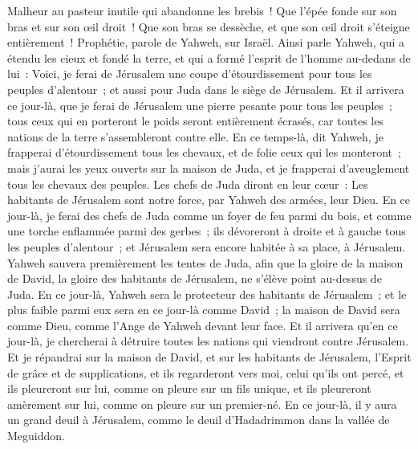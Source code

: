 \begin{multicols}{2}
Malheur au pasteur inutile qui abandonne les brebis~! Que l'épée fonde sur son bras et sur son œil droit~! Que son bras se dessèche, et que son œil droit s'éteigne entièrement~!
\VerseOne{}Prophétie, parole de Yahweh, sur Israël. Ainsi parle Yahweh, qui a étendu les cieux et fondé la terre, et qui a formé l'esprit de l'homme au-dedans de lui~:
Voici, je ferai de Jérusalem une coupe d'étourdissement pour tous les peuples d'alentour~; et aussi pour Juda dans le siège de Jérusalem.
Et il arrivera ce jour-là, que je ferai de Jérusalem une pierre pesante pour tous les peuples~; tous ceux qui en porteront le poids seront entièrement écrasés, car toutes les nations de la terre s'assembleront contre elle.
En ce temps-là, dit Yahweh, je frapperai d'étourdissement tous les chevaux, et de folie ceux qui les monteront~; mais j'aurai les yeux ouverts sur la maison de Juda, et je frapperai d'aveuglement tous les chevaux des peuples.
Les chefs de Juda diront en leur cœur~: Les habitants de Jérusalem sont notre force, par Yahweh des armées, leur Dieu.
En ce jour-là, je ferai des chefs de Juda comme un foyer de feu parmi du bois, et comme une torche enflammée parmi des gerbes~; ils dévoreront à droite et à gauche tous les peuples d'alentour~; et Jérusalem sera encore habitée à sa place, à Jérusalem.
Yahweh sauvera premièrement les tentes de Juda, afin que la gloire de la maison de David, la gloire des habitants de Jérusalem, ne s'élève point au-dessus de Juda.
En ce jour-là, Yahweh sera le protecteur des habitants de Jérusalem~; et le plus faible parmi eux sera en ce jour-là comme David~; la maison de David sera comme Dieu, comme l'Ange de Yahweh devant leur face.
Et il arrivera qu'en ce jour-là, je chercherai à détruire toutes les nations qui viendront contre Jérusalem.
Et je répandrai sur la maison de David, et sur les habitants de Jérusalem, l'Esprit de grâce et de supplications, et ils regarderont vers moi, celui qu'ils ont percé, et ils pleureront sur lui, comme on pleure sur un fils unique, et ils pleureront amèrement sur lui, comme on pleure sur un premier-né.
En ce jour-là, il y aura un grand deuil à Jérusalem, comme le deuil d'Hadadrimmon dans la vallée de Meguiddon.

\end{multicols}
